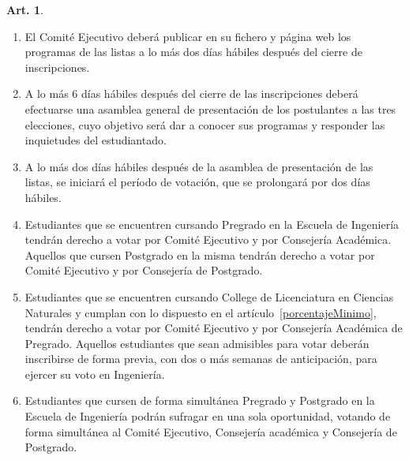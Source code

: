 \documentclass[letterpaper,11pt]{article}
\theoremstyle{definition}%
\newtheorem{art}{Art.} %
\begin{document}
\begin{art}
\begin{enumerate}
		\item El Comité Ejecutivo deberá publicar en su fichero y página web los programas de las listas a lo más dos días hábiles después del cierre de inscripciones.

		\item A lo más 6 días hábiles después del cierre de las inscripciones deberá efectuarse una asamblea general de presentación de los postulantes a las tres elecciones, cuyo objetivo será dar a conocer sus programas y responder las inquietudes del estudiantado.

		\item \label{periodo}A lo más dos días hábiles después de la asamblea de presentación de las listas, se iniciará el período de votación, que se prolongará por dos días hábiles.

		\item \label{votantes}Estudiantes que se encuentren cursando Pregrado en la Escuela de Ingeniería tendrán derecho a votar por Comité Ejecutivo y por Consejería Académica. Aquellos que cursen Postgrado en la misma tendrán derecho a votar por Comité Ejecutivo y por Consejería de Postgrado.

		\item \label{votantesCollege}Estudiantes que se encuentren cursando College de Licenciatura en Ciencias Naturales y cumplan con lo dispuesto en el artículo~\ref{porcentajeMinimo}, tendrán derecho a votar por Comité Ejecutivo y por Consejería Académica de Pregrado. Aquellos estudiantes que sean admisibles para votar deberán inscribirse de forma previa, con dos o más semanas de anticipación, para ejercer su voto en Ingeniería.

		\item Estudiantes que cursen de forma simultánea Pregrado y Postgrado en la Escuela de Ingeniería podrán sufragar en una sola oportunidad, votando de forma simultánea al Comité Ejecutivo, Consejería académica y Consejería de Postgrado.


\end{enumerate}
\end{art}
\end{document}
